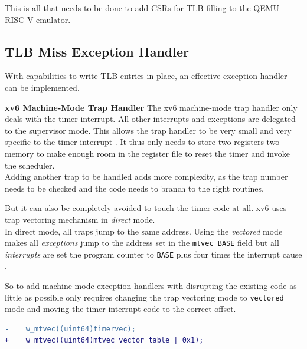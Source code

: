 This is all that needs to be done to add CSRs for TLB filling to the QEMU RISC-V emulator.




\subsection{TLB Miss Exception Handler}
With capabilities to write TLB entries in place, an effective exception handler can be implemented.

\textbf{xv6 Machine-Mode Trap Handler} The xv6 machine-mode trap handler only deals
with the timer interrupt. All other interrupts and exceptions are delegated to the supervisor
mode. This allows the trap handler to be very small and very specific to the timer interrupt \cite{cox2011xv6}.
It thus only needs to store two registers two memory to make enough room in the register file
to reset the timer and invoke the scheduler.\\
Adding another trap to be handled adds more complexity, as the trap number needs to be checked
and the code needs to branch to the right routines.

But it can also be completely avoided to touch the timer code at all. xv6 uses trap vectoring
mechanism in \textit{direct} mode.\\ In direct mode, all traps jump to the same address.
Using the \textit{vectored} mode makes all \textit{exceptions} jump to the address set
in the \texttt{mtvec BASE} field but all \textit{interrupts} are set the program counter
to \texttt{BASE} plus four times the interrupt cause \cite{RISCVInstructionSet}.

So to add machine mode exception handlers with disrupting the existing code as little as possible only
requires changing the trap vectoring mode to \texttt{vectored} mode and moving the timer interrupt code
to the correct offset.

\begin{lstlisting}[language=diff]
-    w_mtvec((uint64)timervec);
+    w_mtvec((uint64)mtvec_vector_table | 0x1);
\end{lstlisting}

